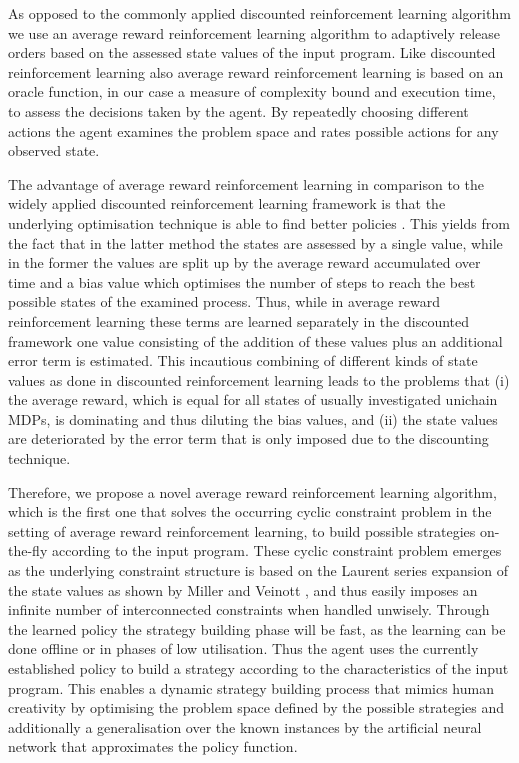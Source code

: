\documentclass[envcountsame]{llncs}
\begin{document}
As opposed to the commonly applied discounted reinforcement learning algorithm we use an average
reward reinforcement learning algorithm to adaptively release orders based on the assessed state
values of the input program. Like discounted reinforcement learning also average reward
reinforcement learning is based on an oracle function, in our case a measure of complexity bound and
execution time, to assess the decisions taken by the agent. By repeatedly choosing different actions
the agent examines the problem space and rates possible actions for any observed state.

The advantage of average reward reinforcement learning in comparison to the widely applied
discounted reinforcement learning framework is that the underlying optimisation technique is able to
find better policies \cite{miller1969discrete,Puterman94}. This yields from the fact that in the
latter method the states are assessed by a single value, while in the former the values are split up
by the average reward accumulated over time and a bias value which optimises the number of steps to
reach the best possible states of the examined process. Thus, while in average reward reinforcement
learning these terms are learned separately in the discounted framework one value consisting of the
addition of these values plus an additional error term is estimated. This incautious combining of
different kinds of state values as done in discounted reinforcement learning leads to the problems
that (i) the average reward, which is equal for all states of usually investigated unichain MDPs, is
dominating and thus diluting the bias values, and (ii) the state values are deteriorated by the
error term that is only imposed due to the discounting technique.


Therefore, we propose a novel average reward reinforcement learning algorithm, which is the first
one that solves the occurring cyclic constraint problem in the setting of average reward
reinforcement learning, to build possible strategies on-the-fly according to the input program.
These cyclic constraint problem emerges as the underlying constraint structure is based on the
Laurent series expansion of the state values as shown by Miller and Veinott
\cite{miller1969discrete}, and thus easily imposes an infinite number of interconnected constraints
when handled unwisely. Through the learned policy the strategy building phase will be fast, as the
learning can be done offline or in phases of low utilisation. Thus the agent uses the currently
established policy to build a strategy according to the characteristics of the input program. This
enables a dynamic strategy building process that mimics human creativity by optimising the problem
space defined by the possible strategies and additionally a generalisation over the known instances
by the artificial neural network that approximates the policy function.
\end{document}
